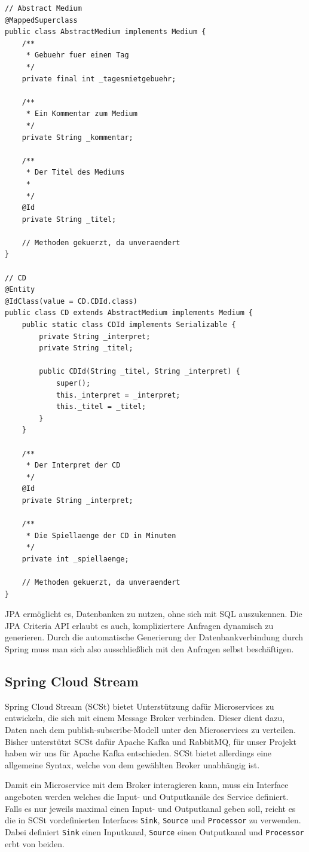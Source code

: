 \documentclass{article}
\begin{document}
\begin{lstlisting}
// Abstract Medium
@MappedSuperclass
public class AbstractMedium implements Medium {
    /**
     * Gebuehr fuer einen Tag
     */
    private final int _tagesmietgebuehr;

    /**
     * Ein Kommentar zum Medium
     */
    private String _kommentar;

    /**
     * Der Titel des Mediums
     *
     */
    @Id
    private String _titel;

    // Methoden gekuerzt, da unveraendert
}

// CD
@Entity
@IdClass(value = CD.CDId.class)
public class CD extends AbstractMedium implements Medium {
    public static class CDId implements Serializable {
        private String _interpret;
        private String _titel;

        public CDId(String _titel, String _interpret) {
            super();
            this._interpret = _interpret;
            this._titel = _titel;
        }
    }

    /**
     * Der Interpret der CD
     */
    @Id
    private String _interpret;

    /**
     * Die Spiellaenge der CD in Minuten
     */
    private int _spiellaenge;

    // Methoden gekuerzt, da unveraendert
}
\end{lstlisting}

JPA ermöglicht es, Datenbanken zu nutzen, ohne sich mit SQL auszukennen.
Die JPA Criteria API erlaubt es auch, kompliziertere Anfragen dynamisch zu generieren.
Durch die automatische Generierung der Datenbankverbindung durch Spring muss man sich also ausschließlich mit den Anfragen selbst beschäftigen.

\subsection{Spring Cloud Stream}

Spring Cloud Stream (SCSt) bietet Unterstützung dafür Microservices zu entwickeln, die sich mit einem Message Broker verbinden.
Dieser dient dazu, Daten nach dem publish-subscribe-Modell unter den Microservices zu verteilen.
Bisher unterstützt SCSt dafür Apache Kafka und RabbitMQ, für unser Projekt haben wir uns für Apache Kafka entschieden.
SCSt bietet allerdings eine allgemeine Syntax, welche von dem gewählten Broker unabhängig ist.

Damit ein Microservice mit dem Broker interagieren kann, muss ein Interface angeboten werden welches die Input- und Outputkanäle des Service definiert.
Falls es nur jeweils maximal einen Input- und Outputkanal geben soll, reicht es die in SCSt vordefinierten Interfaces \texttt{Sink}, \texttt{Source} und \texttt{Processor} zu verwenden.
Dabei definiert \texttt{Sink} einen Inputkanal, \texttt{Source} einen Outputkanal und \texttt{Processor} erbt von beiden.
\end{document}
